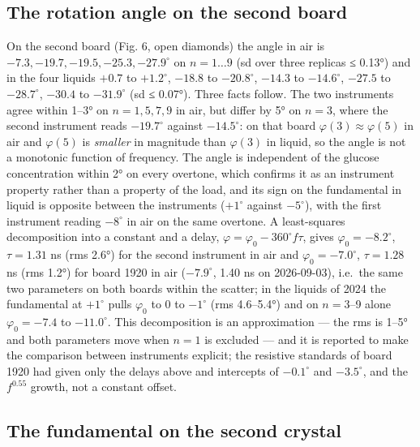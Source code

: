 \documentclass[11pt,a4paper]{article}
\begin{document}
\hypertarget{the-rotation-angle-on-the-second-board}{%
\subsection{The rotation angle on the second
board}\label{the-rotation-angle-on-the-second-board}}

On the second board (Fig. 6, open diamonds) the angle in air is
\(-7.3, -19.7, -19.5, -25.3, -27.9^\circ\) on \(n = 1 \ldots 9\) (sd
over three replicas ≤ 0.13°) and in the four liquids \(+0.7\) to
\(+1.2^\circ\), \(-18.8\) to \(-20.8^\circ\), \(-14.3\) to
\(-14.6^\circ\), \(-27.5\) to \(-28.7^\circ\), \(-30.4\) to
\(-31.9^\circ\) (sd ≤ 0.07°). Three facts follow. The two instruments
agree within 1--3° on \(n = 1, 5, 7, 9\) in air, but differ by 5° on
\(n = 3\), where the second instrument reads \(-19.7^\circ\) against
\(-14.5^\circ\): on that board \(\varphi(3) \approx \varphi(5)\) in air
and \(\varphi(5)\) is \emph{smaller} in magnitude than \(\varphi(3)\) in
liquid, so the angle is not a monotonic function of frequency. The angle
is independent of the glucose concentration within 2° on every overtone,
which confirms it as an instrument property rather than a property of
the load, and its sign on the fundamental in liquid is opposite between
the instruments (\(+1^\circ\) against \(-5^\circ\)), with the first
instrument reading \(-8^\circ\) in air on the same overtone. A
least-squares decomposition into a constant and a delay,
\(\varphi = \varphi_0 - 360^\circ f\tau\), gives
\(\varphi_0 = -8.2^\circ\), \(\tau = 1.31\) ns (rms 2.6°) for the second
instrument in air and \(\varphi_0 = -7.0^\circ\), \(\tau = 1.28\) ns
(rms 1.2°) for board 1920 in air (\(-7.9^\circ\), 1.40 ns on
2026-09-03), i.e.~the same two parameters on both boards within the
scatter; in the liquids of 2024 the fundamental at \(+1^\circ\) pulls
\(\varphi_0\) to 0 to \(-1^\circ\) (rms 4.6--5.4°) and on \(n = 3\)--9
alone \(\varphi_0 = -7.4\) to \(-11.0^\circ\). This decomposition is an
approximation --- the rms is 1--5° and both parameters move when
\(n = 1\) is excluded --- and it is reported to make the comparison
between instruments explicit; the resistive standards of board 1920 had
given only the delays above and intercepts of \(-0.1^\circ\) and
\(-3.5^\circ\), and the \(f^{0.55}\) growth, not a constant offset.

\hypertarget{the-fundamental-on-the-second-crystal}{%
\subsection{The fundamental on the second
crystal}\label{the-fundamental-on-the-second-crystal}}
\end{document}
